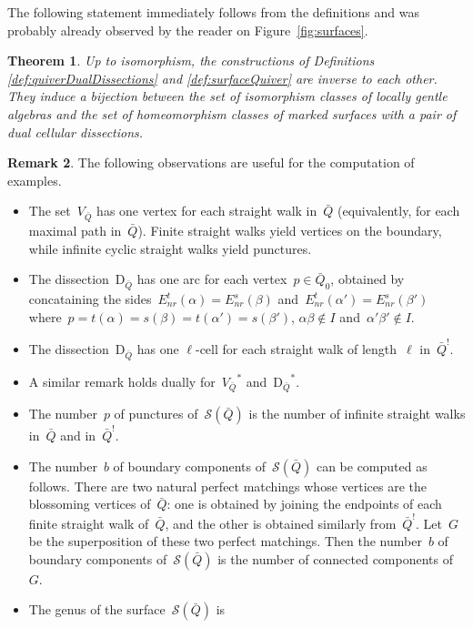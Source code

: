 \documentclass{amsart}
\newtheorem{theorem}{Theorem}[section]
\theoremstyle{definition}
\newtheorem{remark}[theorem]{Remark}
\newcommand{\fref}[1]{Figure~\ref{#1}} %
\newcommand{\Enrs}[1]{E_{nr}^{s}(#1)}
\newcommand{\Enrt}[1]{E_{nr}^{t}(#1)}
\newcommand{\surface}{\mathcal{S}} %
\newcommand{\dual}{^*} %
\newcommand{\dissection}{\mathrm{D}} %
\newcommand{\koszul}{^!} %
\begin{document}
The following statement immediately follows from the definitions and was probably already observed by the reader on \fref{fig:surfaces}.

\begin{theorem}
\label{thm:bijectionLocallyGentleAndSurfaces}
 Up to isomorphism, the constructions of Definitions \ref{def:quiverDualDissections} and \ref{def:surfaceQuiver} are inverse to each other.
 They induce a bijection between the set of isomorphism classes of locally gentle algebras and the set of homeomorphism classes of marked surfaces with a pair of dual cellular dissections.
\end{theorem}

\begin{remark}
\label{rem:propertiesSurface}
The following observations are useful for the computation of examples.
\begin{itemize}
\item The set~$V_{\bar Q}$ has one vertex for each straight walk in~$\bar Q$ (equivalently, for each maximal path in~$\bar Q$).
      Finite straight walks yield vertices on the boundary, while infinite cyclic straight walks yield punctures.
\item The dissection~$\dissection_{\bar Q}$ has one arc for each vertex~$p \in \bar Q_0$, obtained by concataining the sides~$\Enrt{\alpha} = \Enrs{\beta}$ and~$\Enrt{\alpha'} = \Enrs{\beta'}$ where~$p = t(\alpha) = s(\beta) = t(\alpha') = s(\beta')$, $\alpha\beta \notin I$ and~$\alpha'\beta' \notin I$.
\item The dissection~$\dissection_{\bar Q}$ has one $\ell$-cell for each straight walk of length~$\ell$ in~$\bar Q\koszul$.
\item A similar remark holds dually for~${V_{\bar Q}}\dual$ and~${\dissection_{\bar Q}}\dual$.
\item The number~$p$ of punctures of~$\surface(\bar Q)$ is the number of infinite straight walks in~$\bar Q$ and in~$\bar Q\koszul$.
\item The number~$b$ of boundary components of~$\surface(\bar Q)$ can be computed as follows.
      There are two natural perfect matchings whose vertices are the blossoming vertices of~$\bar Q$: one is obtained by joining the endpoints of each finite straight walk of~$\bar Q$, and the other is obtained similarly from~$\bar Q \koszul$.
      Let~$G$ be the superposition of these two perfect matchings.
      Then the number~$b$ of boundary components of~$\surface(\bar Q)$ is the number of connected components of~$G$.
\item The genus of the surface~$\surface(\bar Q)$ is

\end{itemize}
\end{remark}
\end{document}

